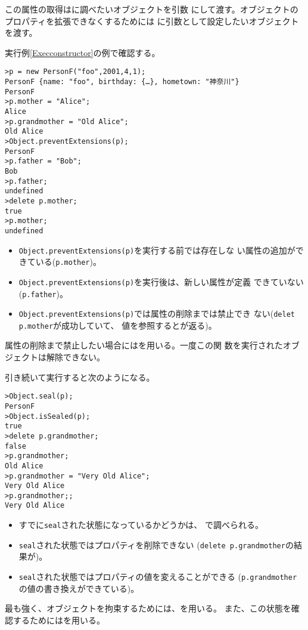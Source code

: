 この属性の取得はに調べたいオブジェクトを引数
にして渡す。オブジェクトのプロパティを拡張できなくするためには
に引数として設定したいオブジェクトを渡す。
 \begin{Exec}\upshape\label{ExecconstructorExtensible}
  実行例\ref{Execconstructor}の例で確認する。
\begin{Verbatim}
>p = new PersonF("foo",2001,4,1);
PersonF {name: "foo", birthday: {…}, hometown: "神奈川"}
PersonF
>p.mother = "Alice";
Alice
>p.grandmother = "Old Alice";
Old Alice
>Object.preventExtensions(p);
PersonF
>p.father = "Bob";
Bob
>p.father;
undefined
>delete p.mother;
true
>p.mother;
undefined
\end{Verbatim}
\begin{itemize}
 \item \texttt{Object.preventExtensions(p)}を実行する前では存在しな
       い属性の追加ができている(\texttt{p.mother})。
 \item \texttt{Object.preventExtensions(p)}を実行後は、新しい属性が定義
			 できていない(\texttt{p.father})。
 \item \texttt{Object.preventExtensions(p)}では属性の削除までは禁止でき
       ない(\texttt{delet p.mother}が成功していて、
			 値を参照するとが返る)。
\end{itemize}
属性の削除まで禁止したい場合にはを用いる。一度この関
数を実行されたオブジェクトは解除できない。
	
引き続いて実行すると次のようになる。
\begin{Verbatim}
>Object.seal(p);
PersonF
>Object.isSealed(p);
true
>delete p.grandmother;
false
>p.grandmother;
Old Alice
>p.grandmother = "Very Old Alice";
Very Old Alice
>p.grandmother;;
Very Old Alice
\end{Verbatim}
\begin{itemize}
	 \item すでに\texttt{seal}された状態になっているかどうかは、
				 で調べられる。
 \item \texttt{seal}された状態ではプロパティを削除できない
			 (\texttt{delete p.grandmother}の結果が)。
 \item \texttt{seal}された状態ではプロパティの値を変えることができる
			 (\texttt{p.grandmother}の値の書き換えができている)。
\end{itemize}
最も強く、オブジェクトを拘束するためには、を用いる。
また、この状態を確認するためにはを用いる。


\end{Exec}
